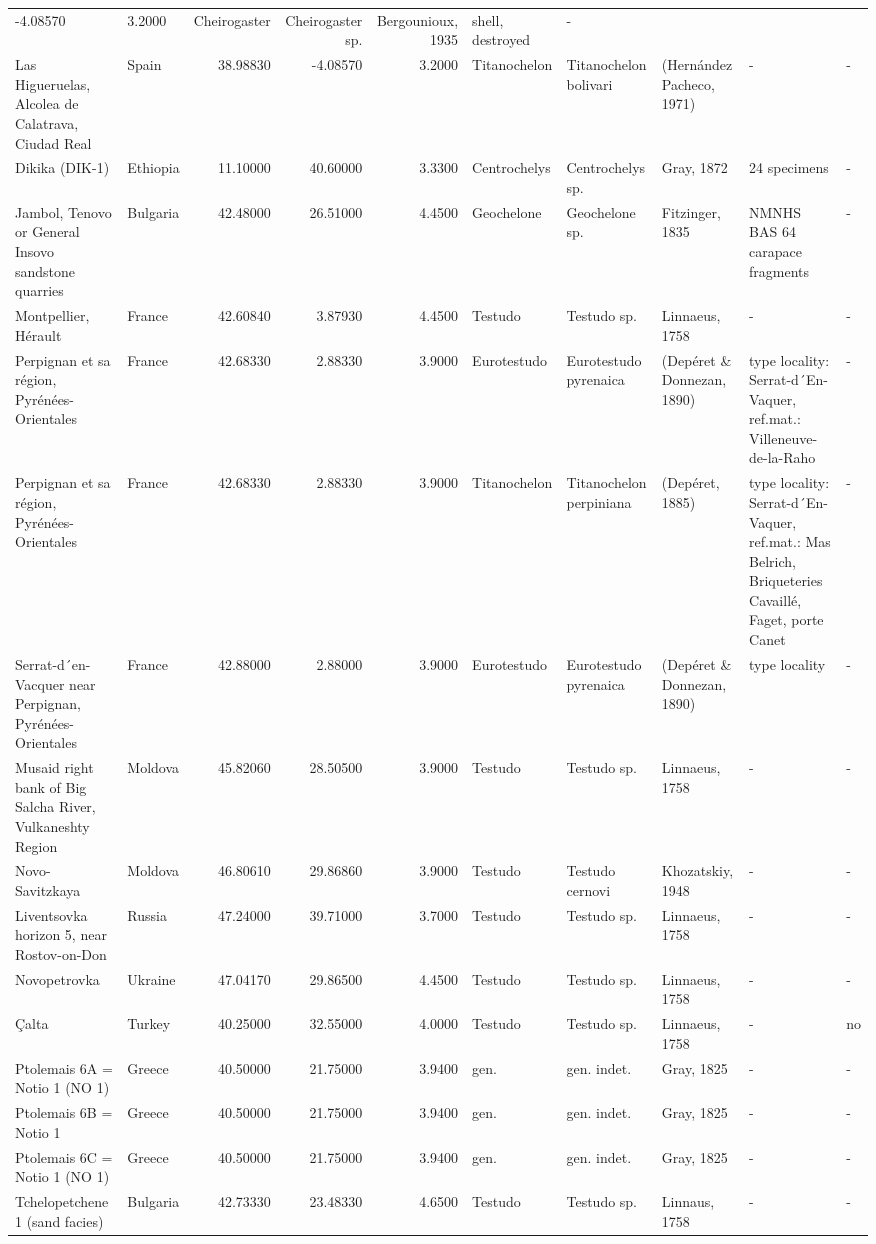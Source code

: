\documentclass[]{article}
\begin{document}
\begin{longtable}[]{@{}llrrrlllll@{}}
-4.08570 & 3.2000 & Cheirogaster & Cheirogaster sp. & Bergounioux, 1935
& shell, destroyed & -\tabularnewline
Las Higueruelas, Alcolea de Calatrava, Ciudad Real & Spain & 38.98830 &
-4.08570 & 3.2000 & Titanochelon & Titanochelon bolivari & (Hernández
Pacheco, 1971) & - & -\tabularnewline
Dikika (DIK-1) & Ethiopia & 11.10000 & 40.60000 & 3.3300 & Centrochelys
& Centrochelys sp. & Gray, 1872 & 24 specimens & -\tabularnewline
Jambol, Tenovo or General Insovo sandstone quarries & Bulgaria &
42.48000 & 26.51000 & 4.4500 & Geochelone & Geochelone sp. & Fitzinger,
1835 & NMNHS BAS 64 carapace fragments & -\tabularnewline
Montpellier, Hérault & France & 42.60840 & 3.87930 & 4.4500 & Testudo &
Testudo sp. & Linnaeus, 1758 & - & -\tabularnewline
Perpignan et sa région, Pyrénées-Orientales & France & 42.68330 &
2.88330 & 3.9000 & Eurotestudo & Eurotestudo pyrenaica & (Depéret \&
Donnezan, 1890) & type locality: Serrat-d´En-Vaquer, ref.mat.:
Villeneuve-de-la-Raho & -\tabularnewline
Perpignan et sa région, Pyrénées-Orientales & France & 42.68330 &
2.88330 & 3.9000 & Titanochelon & Titanochelon perpiniana & (Depéret,
1885) & type locality: Serrat-d´En-Vaquer, ref.mat.: Mas Belrich,
Briqueteries Cavaillé, Faget, porte Canet & -\tabularnewline
Serrat-d´en-Vacquer near Perpignan, Pyrénées-Orientales & France &
42.88000 & 2.88000 & 3.9000 & Eurotestudo & Eurotestudo pyrenaica &
(Depéret \& Donnezan, 1890) & type locality & -\tabularnewline
Musaid right bank of Big Salcha River, Vulkaneshty Region & Moldova &
45.82060 & 28.50500 & 3.9000 & Testudo & Testudo sp. & Linnaeus, 1758 &
- & -\tabularnewline
Novo-Savitzkaya & Moldova & 46.80610 & 29.86860 & 3.9000 & Testudo &
Testudo cernovi & Khozatskiy, 1948 & - & -\tabularnewline
Liventsovka horizon 5, near Rostov-on-Don & Russia & 47.24000 & 39.71000
& 3.7000 & Testudo & Testudo sp. & Linnaeus, 1758 & - & -\tabularnewline
Novopetrovka & Ukraine & 47.04170 & 29.86500 & 4.4500 & Testudo &
Testudo sp. & Linnaeus, 1758 & - & -\tabularnewline
Çalta & Turkey & 40.25000 & 32.55000 & 4.0000 & Testudo & Testudo sp. &
Linnaeus, 1758 & - & no\tabularnewline
Ptolemais 6A = Notio 1 (NO 1) & Greece & 40.50000 & 21.75000 & 3.9400 &
gen. & gen. indet. & Gray, 1825 & - & -\tabularnewline
Ptolemais 6B = Notio 1 & Greece & 40.50000 & 21.75000 & 3.9400 & gen. &
gen. indet. & Gray, 1825 & - & -\tabularnewline
Ptolemais 6C = Notio 1 (NO 1) & Greece & 40.50000 & 21.75000 & 3.9400 &
gen. & gen. indet. & Gray, 1825 & - & -\tabularnewline
Tchelopetchene 1 (sand facies) & Bulgaria & 42.73330 & 23.48330 & 4.6500
& Testudo & Testudo sp. & Linnaus, 1758 & - & -\tabularnewline

\end{longtable}
\end{document}
